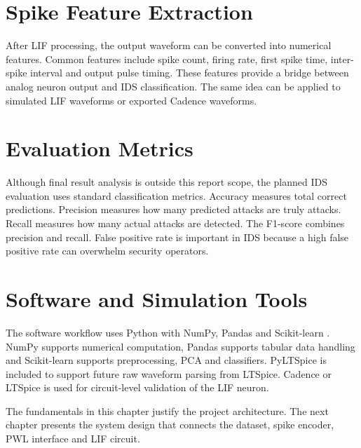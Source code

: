\section{Spike Feature Extraction}

After LIF processing, the output waveform can be converted into numerical features. Common features include spike count, firing rate, first spike time, inter-spike interval and output pulse timing. These features provide a bridge between analog neuron output and IDS classification. The same idea can be applied to simulated LIF waveforms or exported Cadence waveforms.

\section{Evaluation Metrics}

Although final result analysis is outside this report scope, the planned IDS evaluation uses standard classification metrics. Accuracy measures total correct predictions. Precision measures how many predicted attacks are truly attacks. Recall measures how many actual attacks are detected. The F1-score combines precision and recall. False positive rate is important in IDS because a high false positive rate can overwhelm security operators.

\section{Software and Simulation Tools}

The software workflow uses Python with NumPy, Pandas and Scikit-learn \cite{Pedregosa2011}. NumPy supports numerical computation, Pandas supports tabular data handling and Scikit-learn supports preprocessing, PCA and classifiers. PyLTSpice is included to support future raw waveform parsing from LTSpice. Cadence or LTSpice is used for circuit-level validation of the LIF neuron.

The fundamentals in this chapter justify the project architecture. The next chapter presents the system design that connects the dataset, spike encoder, PWL interface and LIF circuit.

